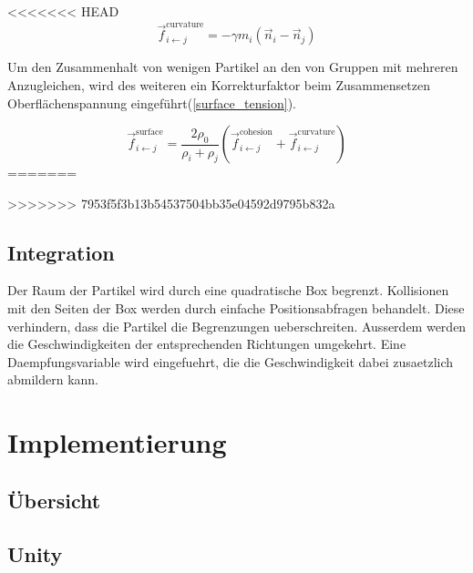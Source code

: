\documentclass[a4paper]{paper}
\begin{document}

<<<<<<< HEAD
\begin{equation}
\label{curvature}
\vec{f}_{i\leftarrow j}^{\text{curvature}} = -\gamma m_{i}(\vec{n}_i - \vec{n}_j)
\end{equation}

Um den Zusammenhalt von wenigen Partikel an den von Gruppen mit mehreren Anzugleichen, wird des weiteren ein Korrekturfaktor beim Zusammensetzen Oberflächenspannung eingeführt(\ref{surface_tension}).

\begin{equation}
	\label{surface_tension}
	\vec{f}_{i\leftarrow j}^{\text{surface}} = \frac{2\rho_{0}}{\rho_{i}+\rho_{j}} (\vec{f}_{i\leftarrow j}^{\text{cohesion}} + \vec{f}_{i\leftarrow j}^{\text{curvature}})
\end{equation}
=======

>>>>>>> 7953f5f3b13b54537504bb35e04592d9795b832a


\subsection{Integration}

Der Raum der Partikel wird durch eine quadratische Box begrenzt. Kollisionen mit den Seiten der Box werden durch einfache Positionsabfragen behandelt. Diese verhindern, dass die Partikel die Begrenzungen ueberschreiten. Ausserdem werden die Geschwindigkeiten der entsprechenden Richtungen umgekehrt. Eine Daempfungsvariable wird eingefuehrt, die die Geschwindigkeit dabei zusaetzlich abmildern kann.

\section{Implementierung}
\subsection{Übersicht}
\subsection{Unity}
\end{document}
